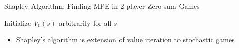\documentclass[11pt,aspectratio=169]{beamer}
\begin{document}
  
  \begin{frame}{Shapley Algorithm: Finding MPE in 2-player Zero-sum Games}
   \begin{algorithm*}[H]
    Initialize $V_0(s)$ arbitrarily for all $s$
   \end{algorithm*}
   \vspace{2em}
   \begin{itemize}
    \item<2-> Shapley's algorithm is \alert{extension of value iteration} to stochastic games
   \end{itemize}
  \end{frame}
  
\end{document}
